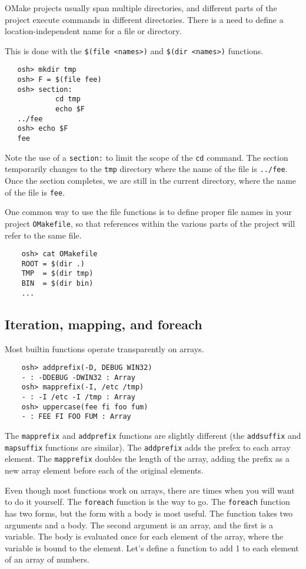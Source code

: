 OMake projects usually span multiple directories, and different parts of the project execute
commands in different directories.  There is a need to define a location-independent name for a file
or directory.

This is done with the \verb+$(file <names>)+ and \verb+$(dir <names>)+ functions.

\begin{verbatim}
   osh> mkdir tmp
   osh> F = $(file fee)
   osh> section:
            cd tmp
            echo $F
   ../fee
   osh> echo $F
   fee
\end{verbatim}

Note the use of a \verb+section:+ to limit the scope of the \verb+cd+ command.  The section
temporarily changes to the \verb+tmp+ directory where the name of the file is \verb+../fee+.  Once
the section completes, we are still in the current directory, where the name of the file is
\verb+fee+.

One common way to use the file functions is to define proper file names in your project
\verb+OMakefile+, so that references within the various parts of the project will refer to the same
file.

\begin{verbatim}
    osh> cat OMakefile
    ROOT = $(dir .)
    TMP  = $(dir tmp)
    BIN  = $(dir bin)
    ...
\end{verbatim}

\subsection{Iteration, mapping, and foreach}

Most builtin functions operate transparently on arrays.

\begin{verbatim}
    osh> addprefix(-D, DEBUG WIN32)
    - : -DDEBUG -DWIN32 : Array
    osh> mapprefix(-I, /etc /tmp)
    - : -I /etc -I /tmp : Array
    osh> uppercase(fee fi foo fum)
    - : FEE FI FOO FUM : Array
\end{verbatim}

The \verb+mapprefix+ and \verb+addprefix+ functions are slightly different (the \verb+addsuffix+ and
\verb+mapsuffix+ functions are similar).  The \verb+addprefix+ adds the prefex to each array
element.  The \verb+mapprefix+ doubles the length of the array, adding the prefix as a new array
element before each of the original elements.

Even though most functions work on arrays, there are times when you will want to do it yourself.
The \verb+foreach+ function is the way to go.  The \verb+foreach+ function has two forms, but the
form with a body is most useful.  The function takes two arguments and a body.  The second argument
is an array, and the first is a variable.  The body is evaluated once for each element of the array,
where the variable is bound to the element.  Let's define a function to add 1 to each element of an
array of numbers.


